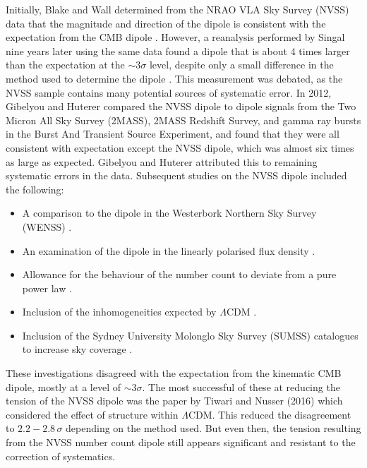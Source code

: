 \documentclass[a4paper,12pt]{report}
\begin{document}
Initially, Blake and Wall determined from the NRAO VLA Sky Survey (NVSS) data that the magnitude and direction of the dipole is consistent with the expectation from the CMB dipole \cite{RN88}. However, a reanalysis performed by Singal nine years later using the same data found a dipole that is about 4 times larger than the expectation at the $\sim 3\sigma$ level, despite only a small difference in the method used to determine the dipole \cite{RN90}. This measurement was debated, as the NVSS sample contains many potential sources of systematic error. In 2012, Gibelyou and Huterer \cite{RN171} compared the NVSS dipole to dipole signals from the Two Micron All Sky Survey (2MASS), 2MASS Redshift Survey, and gamma ray bursts in the Burst And Transient Source Experiment, and found that they were all consistent with expectation except the NVSS dipole, which was almost six times as large as expected. Gibelyou and Huterer attributed this to remaining systematic errors in the data. Subsequent studies on the NVSS dipole included the following:
\begin{itemize}
    \item A comparison to the dipole in the Westerbork Northern Sky Survey (WENSS) \cite{RN95,RN170}.
    \item An examination of the dipole in the linearly polarised flux density \cite{RN169}.
    \item Allowance for the behaviour of the number count to deviate from a pure power law \cite{RN172}.
    \item Inclusion of the inhomogeneities expected by $\Lambda$CDM \cite{RN84}.
    \item Inclusion of the Sydney University Molonglo Sky Survey (SUMSS) catalogues to increase sky coverage \cite{RN34}.
\end{itemize}
These investigations disagreed with the expectation from the kinematic CMB dipole, mostly at a level of $\sim 3\sigma$.
The most successful of these at reducing the tension of the NVSS dipole was the paper by Tiwari and Nusser (2016) \cite{RN84} which considered the effect of structure within $\Lambda$CDM. This reduced the disagreement to $2.2 - 2.8\, \sigma$ depending on the method used. But even then, the tension resulting from the NVSS number count dipole still appears significant and resistant to the correction of systematics.
\end{document}
